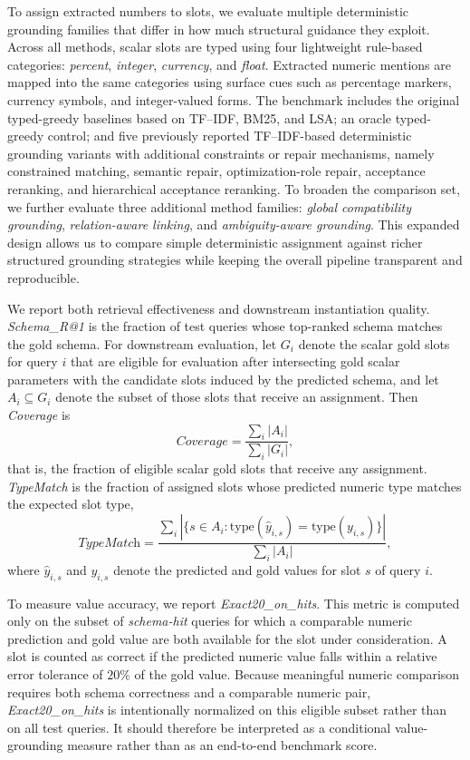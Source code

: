 \documentclass[pdflatex,sn-basic,Numbered]{sn-jnl}
\begin{document}
To assign extracted numbers to slots, we evaluate multiple deterministic grounding families that differ in how much structural guidance they exploit. Across all methods, scalar slots are typed using four lightweight rule-based categories: \emph{percent}, \emph{integer}, \emph{currency}, and \emph{float}. Extracted numeric mentions are mapped into the same categories using surface cues such as percentage markers, currency symbols, and integer-valued forms. The benchmark includes the original typed-greedy baselines based on TF--IDF, BM25, and LSA; an oracle typed-greedy control; and five previously reported TF--IDF-based deterministic grounding variants with additional constraints or repair mechanisms, namely constrained matching, semantic repair, optimization-role repair, acceptance reranking, and hierarchical acceptance reranking. To broaden the comparison set, we further evaluate three additional method families: \emph{global compatibility grounding}, \emph{relation-aware linking}, and \emph{ambiguity-aware grounding}. This expanded design allows us to compare simple deterministic assignment against richer structured grounding strategies while keeping the overall pipeline transparent and reproducible.

We report both retrieval effectiveness and downstream instantiation quality. \textit{Schema\_R@1} is the fraction of test queries whose top-ranked schema matches the gold schema. For downstream evaluation, let $G_i$ denote the scalar gold slots for query $i$ that are eligible for evaluation after intersecting gold scalar parameters with the candidate slots induced by the predicted schema, and let $A_i \subseteq G_i$ denote the subset of those slots that receive an assignment. Then \textit{Coverage} is
\begin{equation}
\textit{Coverage}
=
\frac{\sum_i |A_i|}{\sum_i |G_i|},
\label{eq:coverage}
\end{equation}
that is, the fraction of eligible scalar gold slots that receive any assignment. \textit{TypeMatch} is the fraction of assigned slots whose predicted numeric type matches the expected slot type,
\begin{equation}
\textit{TypeMatch}
=
\frac{\sum_i |\{s \in A_i : \mathrm{type}(\hat{y}_{i,s}) = \mathrm{type}(y_{i,s})\}|}{\sum_i |A_i|},
\label{eq:typematch}
\end{equation}
where $\hat{y}_{i,s}$ and $y_{i,s}$ denote the predicted and gold values for slot $s$ of query $i$.

To measure value accuracy, we report \textit{Exact20\_on\_hits}. This metric is computed only on the subset of \emph{schema-hit} queries for which a comparable numeric prediction and gold value are both available for the slot under consideration. A slot is counted as correct if the predicted numeric value falls within a relative error tolerance of $20\%$ of the gold value. Because meaningful numeric comparison requires both schema correctness and a comparable numeric pair, \textit{Exact20\_on\_hits} is intentionally normalized on this eligible subset rather than on all test queries. It should therefore be interpreted as a conditional value-grounding measure rather than as an end-to-end benchmark score.
\end{document}
